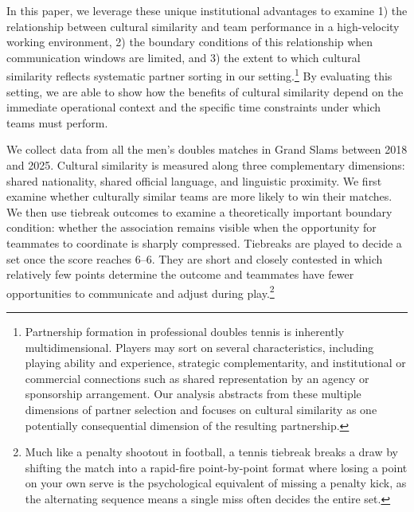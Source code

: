 \documentclass[10pt]{article}
\begin{document}
In this paper, we leverage these unique institutional advantages to examine 1) the relationship between cultural similarity and team performance in a high-velocity working environment, 2) the boundary conditions of this relationship when communication windows are limited, and 3) the extent to which cultural similarity reflects systematic partner sorting in our setting.\footnote{Partnership formation in professional doubles tennis is inherently multidimensional. Players may sort on several characteristics, including playing ability and experience, strategic complementarity, and institutional or commercial connections such as shared representation by an agency or sponsorship arrangement. Our analysis abstracts from these multiple dimensions of partner selection and focuses on cultural similarity as one potentially consequential dimension of the resulting partnership.} By evaluating this setting, we are able to show how the benefits of cultural similarity depend on the immediate operational context and the specific time constraints under which teams must perform.

We collect data from all the men's doubles matches in Grand Slams between 2018 and 2025.  Cultural similarity is measured along three complementary dimensions: shared nationality, shared official language, and linguistic proximity. We first examine whether culturally similar teams are more likely to win their matches. We then use tiebreak outcomes to examine a theoretically important boundary condition: whether the association remains visible when the opportunity for teammates to coordinate is sharply compressed. Tiebreaks are played to decide a set once the score reaches 6--6. They are short and closely contested in which relatively few points determine the outcome and teammates have fewer opportunities to communicate and adjust during play.\footnote{Much like a penalty shootout in football, a tennis tiebreak breaks a draw by shifting the match into a rapid-fire point-by-point format where losing a point on your own serve is the psychological equivalent of missing a penalty kick, as the alternating sequence means a single miss often decides the entire set.}
\end{document}
